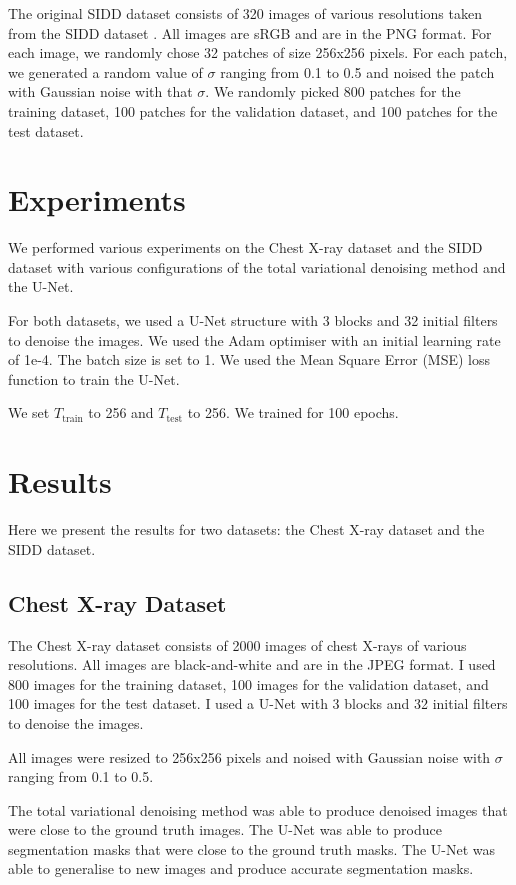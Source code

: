 \documentclass[12pt]{article}
\begin{document}
The original SIDD dataset consists of 320 images of various resolutions taken from the SIDD dataset \cite{sidd}.
All images are sRGB and are in the PNG format.
For each image, we randomly chose 32 patches of size 256x256 pixels.
For each patch, we generated a random value of $\sigma$ ranging from 0.1 to 0.5 and noised the patch with Gaussian noise with that $\sigma$.
We randomly picked 800 patches for the training dataset, 100 patches for the validation dataset, and 100 patches for the test dataset.

\section{Experiments}

We performed various experiments on the Chest X-ray dataset and the SIDD dataset with various configurations of the total variational denoising method and the U-Net.

For both datasets, we used a U-Net structure with 3 blocks and 32 initial filters to denoise the images.
We used the Adam optimiser with an initial learning rate of 1e-4.
The batch size is set to 1.
We used the Mean Square Error (MSE) loss function to train the U-Net.

We set $T_{\text{train}}$ to 256 and $T_{\text{test}}$ to 256.
We trained for 100 epochs.



\section{Results}

Here we present the results for two datasets: the Chest X-ray dataset and the SIDD dataset.

\subsection{Chest X-ray Dataset}

The Chest X-ray dataset consists of 2000 images of chest X-rays of various resolutions. 
All images are black-and-white and are in the JPEG format.
I used 800 images for the training dataset, 100 images for the validation dataset, and 100 images for the test dataset.
I used a U-Net with 3 blocks and 32 initial filters to denoise the images.

All images were resized to 256x256 pixels and noised with Gaussian noise with $\sigma$ ranging from 0.1 to 0.5.

The total variational denoising method was able to produce denoised images that were close to the ground truth images.
The U-Net was able to produce segmentation masks that were close to the ground truth masks.
The U-Net was able to generalise to new images and produce accurate segmentation masks.
\end{document}
